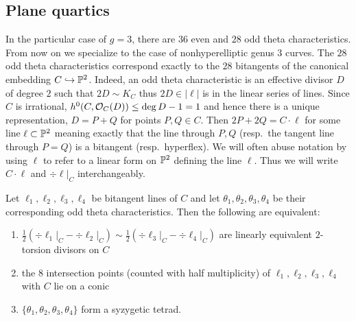 \documentclass[main.tex]{subfiles}
\begin{document}
\subsection{Plane quartics}

In the particular case of $g = 3$, there are $36$ even and $28$ odd theta characteristics. From now on we specialize to the case of nonhyperelliptic genus $3$ curves. The $28$ odd theta characteristics correspond exactly to the $28$ bitangents of the canonical embedding $C \embed \P^2$. Indeed, an odd theta characteristic is an effective divisor $D$ of degree $2$ such that $2D \sim K_C$ thus $2D \in |\ell|$ is in the linear series of lines. Since $C$ is irrational, $h^0(C, \cO_C(D)) \le \deg{D} - 1 = 1$ and hence there is a unique representation, $D = P + Q$ for points $P, Q \in C$. Then $2 P + 2 Q = C \cdot \ell$ for some line $\ell \subset \P^2$ meaning exactly that the line through $P, Q$ (resp.\ the tangent line through $P = Q$) is a bitangent (resp.\ hyperflex). We will often abuse notation by using $\ell$ to refer to a linear form on $\P^2$ defining the line $\ell$. Thus we will write $C \cdot \ell$ and $\div{\ell|_C}$ interchangeably. 

\begin{lemma} \label{lem:syzygetic_lines}
Let $\ell_1, \ell_2, \ell_3, \ell_4$ be bitangent lines of $C$ and let $\theta_1, \theta_2, \theta_3, \theta_4$ be their corresponding odd theta characteristics. Then the following are equivalent:
\begin{enumerate}
\item[(1)] $\frac{1}{2} (\div{\ell_1|_C} - \div{\ell_2|_C}) \sim \frac{1}{2} (\div{\ell_3|_C} - \div{\ell_4|_C})$ are linearly equivalent $2$-torsion divisors on $C$
\item[(2)] the $8$ intersection points (counted with half multiplicity) of $\ell_1, \ell_2, \ell_3, \ell_4$ with $C$ lie on a conic
\item[(3)] $\{ \theta_1, \theta_2, \theta_3, \theta_4 \}$ form a syzygetic tetrad.
\end{enumerate}
\end{lemma}
\end{document}
